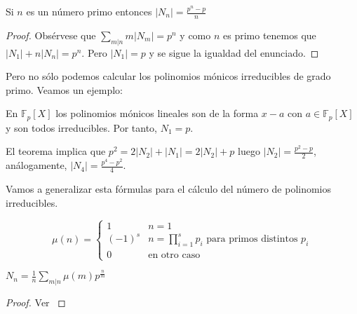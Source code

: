 \begin{corollary}
	Si $n$ es un número primo entonces $|N_n| = \frac{p^n-p}{n}$
\end{corollary}
\begin{proof}
	Obsérvese que $\sum_{m|n} m |N_m| = p^n$ y como $n$ es primo tenemos que $|N_1| + n|N_n| = p^n$. Pero $|N_1| = p$ y se sigue la igualdad del enunciado. 
\end{proof}

Pero no sólo podemos calcular los polinomios mónicos irreducibles de grado primo. Veamos un ejemplo:

\begin{example}
	En $\mathbb{F}_p[X]$ los polinomios mónicos lineales son de la forma $x-a$ con $a \in \mathbb{F}_p[X]$ y son todos irreducibles. Por tanto, $N_1 = p$.
	
	El teorema implica que $p^2 = 2 |N_2| + |N_1| = 2 |N_2| + p$ luego $|N_2| = \frac{p^2 - p}{2}$, análogamente, $|N_4| = \frac{p^4 - p^2}{4}$.
\end{example}

Vamos a generalizar esta fórmulas para el cálculo del número de polinomios irreducibles. 

\begin{definition}
	\[
	\mu(n) = 
	\begin{cases} 
	1 & n = 1 \\
	(-1)^s & n = \prod_{i = 1}^s p_i  \text{ para primos distintos } p_i \\
	0   & \text{en otro caso}
	\end{cases}
	\]
\end{definition}


\begin{theorem}
	$N_n = \frac{1}{n} \sum_{m|n} \mu(m) p^{\frac{n}{m}}$
\end{theorem}
\begin{proof}
	Ver \cite{counting-irreducible}
\end{proof}




